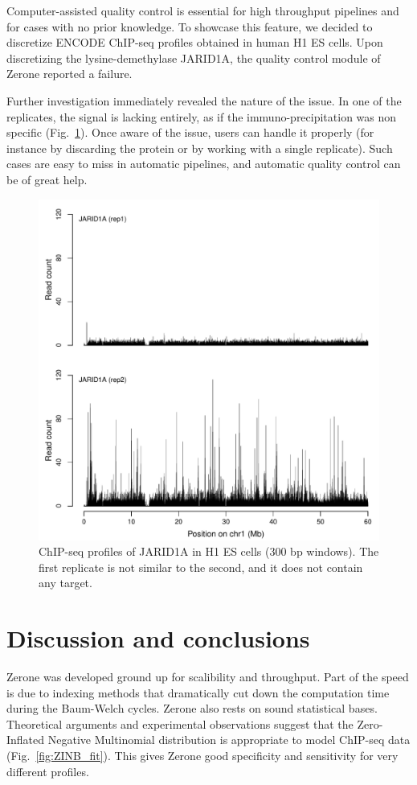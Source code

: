 \documentclass{bioinfo}
\begin{document}
Computer-assisted quality control is essential for high throughput
pipelines and for cases with no prior knowledge. To showcase this
feature, we decided to discretize ENCODE ChIP-seq profiles obtained
in human H1 ES cells. Upon discretizing the lysine-demethylase
JARID1A, the quality control module of Zerone reported a failure.

Further investigation immediately revealed the nature of the issue.
In one of the replicates, the signal is lacking entirely, as if
the immuno-precipitation was non specific (Fig.~\ref{fig:jarid}).
Once aware of the issue, users can handle it properly (for instance
by discarding the protein or by working with a single replicate).
Such cases are easy to miss in automatic pipelines, and automatic
quality control can be of great help.

\begin{figure}[!tpb]
\centerline{\includegraphics[scale=0.5]{jarid.pdf}}
\caption{
  ChIP-seq profiles of JARID1A in H1 ES cells (300 bp windows).
  The first replicate is not similar to the second, and it does not
  contain any target.
}\label{fig:jarid}
\end{figure}

\section{Discussion and conclusions}
Zerone was developed ground up for scalibility and throughput.
Part of the speed is due to indexing methods that dramatically
cut down the computation time during the Baum-Welch cycles. Zerone
also rests on sound statistical bases. Theoretical arguments and
experimental observations suggest that the Zero-Inflated Negative
Multinomial distribution is appropriate to model ChIP-seq data
(Fig.~\ref{fig:ZINB_fit}). This gives Zerone good specificity
and sensitivity for very different profiles.
\end{document}
